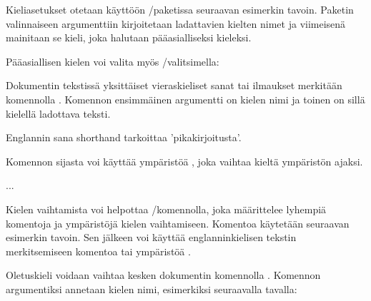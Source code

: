 Kieliasetukset otetaan käyttöön \-/paketissa seuraavan
esimerkin tavoin. Paketin valinnaiseen argumenttiin kirjoitetaan
ladattavien kielten nimet ja viimeisenä mainitaan se kieli, joka
halutaan pääasialliseksi kieleksi.

\begin{koodilohkosis}
  \usepackage[english,greek,finnish]{babel}
\end{koodilohkosis}

Pääasiallisen kielen voi valita myös \-/valitsimella:

\begin{koodilohkosis}
  \usepackage[main=finnish,english,greek]{babel}
\end{koodilohkosis}

Dokumentin tekstissä yksittäiset vieraskieliset sanat tai ilmaukset
merkitään komennolla . Komennon
ensimmäinen argumentti on kielen nimi ja toinen on sillä kielellä
ladottava teksti.

\begin{koodilohkosis}
  Englannin sana \foreignlanguage{english}{shorthand} tarkoittaa
  'pikakirjoitusta'.
\end{koodilohkosis}

Komennon sijasta voi käyttää ympäristöä , joka
vaihtaa kieltä ympäristön ajaksi.

\begin{koodilohkosis}
  \begin{otherlanguage}{greek}
    ...
  \end{otherlanguage}
\end{koodilohkosis}

Kielen vaihtamista voi helpottaa \-/komennolla,
joka määrittelee lyhempiä komentoja ja ympäristöjä kielen vaihtamiseen.
Komentoa käytetään seuraavan esimerkin tavoin. Sen jälkeen voi käyttää
englanninkielisen tekstin merkitsemiseen komentoa  tai ympäristöä .

\begin{koodilohkosis}
\end{koodilohkosis}

Oletuskieli voidaan vaihtaa kesken dokumentin komennolla . Komennon argumentiksi annetaan kielen nimi,
esimerkiksi seuraavalla tavalla:

\begin{koodilohkosis}
\end{koodilohkosis}

